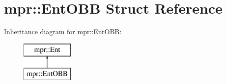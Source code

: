 \hypertarget{structmpr_1_1_ent_o_b_b}{}\section{mpr\+:\+:Ent\+O\+BB Struct Reference}
\label{structmpr_1_1_ent_o_b_b}
Inheritance diagram for mpr\+:\+:Ent\+O\+BB\+:\begin{figure}[H]
\begin{center}
\leavevmode
\includegraphics[height=2.000000cm]{structmpr_1_1_ent_o_b_b}
\end{center}
\end{figure}
